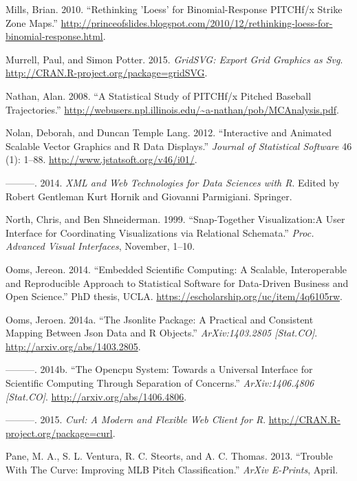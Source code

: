 \documentclass[12pt,]{isuthesis}
\begin{document}
\hypertarget{ref-loess}{}
Mills, Brian. 2010. ``Rethinking 'Loess' for Binomial-Response PITCHf/x
Strike Zone Maps.''
\url{http://princeofslides.blogspot.com/2010/12/rethinking-loess-for-binomial-response.html}.

\hypertarget{ref-gridSVG}{}
Murrell, Paul, and Simon Potter. 2015. \emph{GridSVG: Export Grid
Graphics as Svg}. \url{http://CRAN.R-project.org/package=gridSVG}.

\hypertarget{ref-trajecoryAnalysis}{}
Nathan, Alan. 2008. ``A Statistical Study of PITCHf/x Pitched Baseball
Trajectories.''
\url{http://webusers.npl.illinois.edu/~a-nathan/pob/MCAnalysis.pdf}.

\hypertarget{ref-SVGAnnotation}{}
Nolan, Deborah, and Duncan Temple Lang. 2012. ``Interactive and Animated
Scalable Vector Graphics and R Data Displays.'' \emph{Journal of
Statistical Software} 46 (1): 1--88.
\url{http://www.jstatsoft.org/v46/i01/}.

\hypertarget{ref-nolan-lang}{}
---------. 2014. \emph{XML and Web Technologies for Data Sciences with
R}. Edited by Robert Gentleman Kurt Hornik and Giovanni Parmigiani.
Springer.

\hypertarget{ref-North:1999vi}{}
North, Chris, and Ben Shneiderman. 1999. ``Snap-Together Visualization:A
User Interface for Coordinating Visualizations via Relational
Schemata.'' \emph{Proc. Advanced Visual Interfaces}, November, 1--10.

\hypertarget{ref-embedded-computing}{}
Ooms, Jereon. 2014. ``Embedded Scientific Computing: A Scalable,
Interoperable and Reproducible Approach to Statistical Software for
Data-Driven Business and Open Science.'' PhD thesis, UCLA.
\url{https://escholarship.org/uc/item/4q6105rw}.

\hypertarget{ref-jsonlite}{}
Ooms, Jeroen. 2014a. ``The Jsonlite Package: A Practical and Consistent
Mapping Between Json Data and R Objects.'' \emph{ArXiv:1403.2805
{[}Stat.CO{]}}. \url{http://arxiv.org/abs/1403.2805}.

\hypertarget{ref-opencpu}{}
---------. 2014b. ``The Opencpu System: Towards a Universal Interface
for Scientific Computing Through Separation of Concerns.''
\emph{ArXiv:1406.4806 {[}Stat.CO{]}}.
\url{http://arxiv.org/abs/1406.4806}.

\hypertarget{ref-curl}{}
---------. 2015. \emph{Curl: A Modern and Flexible Web Client for R}.
\url{http://CRAN.R-project.org/package=curl}.

\hypertarget{ref-curve}{}
Pane, M. A., S. L. Ventura, R. C. Steorts, and A. C. Thomas. 2013.
``Trouble With The Curve: Improving MLB Pitch Classification.''
\emph{ArXiv E-Prints}, April.
\end{document}
